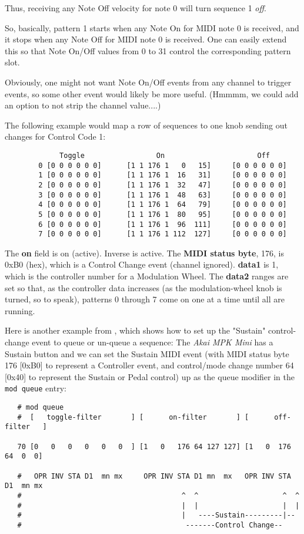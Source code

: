    Thus, receiving any Note Off velocity for note 0 will turn sequence
   1 \textsl{off}.

   So, basically, pattern 1 starts when any Note On for MIDI note 0
   is received, and it stops when any Note Off for MIDI note 0 is received.  
   One can easily extend this so that Note On/Off values from 0 to 31
   control the corresponding pattern slot.

   Obviously, one might not want Note On/Off events from any channel to trigger
   events, so some other event would likely be more useful.
   (Hmmmm, we could add an option to not strip the channel value....)

   The following example would map a row of sequences to one knob sending
   out changes for Control Code 1:

   \begin{verbatim}
             Toggle                 On                      Off
        0 [0 0 0 0 0 0]      [1 1 176 1   0   15]     [0 0 0 0 0 0]
        1 [0 0 0 0 0 0]      [1 1 176 1  16   31]     [0 0 0 0 0 0]
        2 [0 0 0 0 0 0]      [1 1 176 1  32   47]     [0 0 0 0 0 0]
        3 [0 0 0 0 0 0]      [1 1 176 1  48   63]     [0 0 0 0 0 0]
        4 [0 0 0 0 0 0]      [1 1 176 1  64   79]     [0 0 0 0 0 0]
        5 [0 0 0 0 0 0]      [1 1 176 1  80   95]     [0 0 0 0 0 0]
        6 [0 0 0 0 0 0]      [1 1 176 1  96  111]     [0 0 0 0 0 0]
        7 [0 0 0 0 0 0]      [1 1 176 1 112  127]     [0 0 0 0 0 0]
   \end{verbatim}

   The \textbf{on} field is on (active).  Inverse is active.  The
   \textbf{MIDI status byte}, 176, is 0xB0 (hex), which is a Control Change
   event (channel ignored).  \textbf{data1} is 1, which is the controller
   number for a Modulation Wheel.  The \textbf{data2} ranges are set so
   that, as the controller data increases (as the modulation-wheel knob is
   turned, so to speak), patterns 0 through 7 come on one at a time until
   all are running.

   Here is another example from \cite{midicontrol}, which shows how to set up
   the "Sustain" control-change event to queue or un-queue a sequence:
   The \textsl{Akai MPK Mini} has a Sustain button and we can set the
   Sustain MIDI event (with MIDI status byte 176 [0xB0] to represent a
   Controller event, and control/mode change number 64 [0x40] to
   represent the Sustain or Pedal control) up as the queue modifier in
   the \texttt{mod queue} entry:

   \begin{verbatim}
   # mod queue
   #  [   toggle-filter       ] [      on-filter       ] [      off-filter   ]

   70 [0   0   0   0   0   0  ] [1   0   176 64 127 127] [1   0  176 64  0  0]

   #   OPR INV STA D1  mn mx     OPR INV STA D1 mn  mx   OPR INV STA D1  mn mx
   #                                      ^  ^                    ^  ^
   #                                      |  |                    |  |
   #                                      |   ----Sustain---------|--
   #                                       -------Control Change--
   \end{verbatim}

